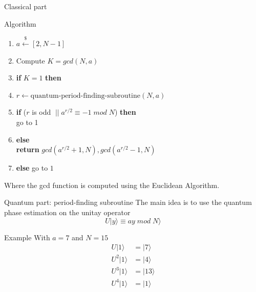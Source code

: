 \documentclass{beamer}
\begin{document}
    \begin{frame}{Classical part}
        \begin{alertblock}{Algorithm}
            \begin{enumerate}
                \item $a \overset{\$}{\leftarrow} [2, N-1]$
                \item Compute $K = gcd(N,a)$
                \item \textbf{if} $K = 1 $ \textbf{then}
                \item \hspace{0.5cm} $r \leftarrow \text{quantum-period-finding-subroutine}(N,a)$
                \item \hspace{0.5cm} \textbf{if} ($r$ is odd $\; || \; a^{r/2} \equiv -1 \; mod \; N$)   \textbf{then} \\ \hspace{1cm} go to 1
                \item \hspace{0.5cm} \textbf{else} \\ \hspace{1cm} \textbf{return} $gcd(a^{r/2} + 1, N), gcd(a^{r/2} - 1, N)$
                \item \textbf{else} go to $1$
            \end{enumerate}
        \end{alertblock}

        Where the gcd function is computed using the Euclidean Algorithm.
    \end{frame}

    \begin{frame}{Quantum part: period-finding subroutine}
        The main idea is to use the quantum phase estimation on the unitay
        operator $$ U|y \rangle \equiv ay \; mod \; N \rangle$$

        \begin{exampleblock}{Example}
            With $a = 7$ and $N = 15$
            \begin{align*}
                U|1 \rangle &= |7 \rangle \\
                U^2|1 \rangle &= |4 \rangle \\
                U^3|1 \rangle &= |13 \rangle \\
                U^4|1 \rangle &= |1 \rangle
            \end{align*}
        \end{exampleblock}
    \end{frame}
\end{document}
